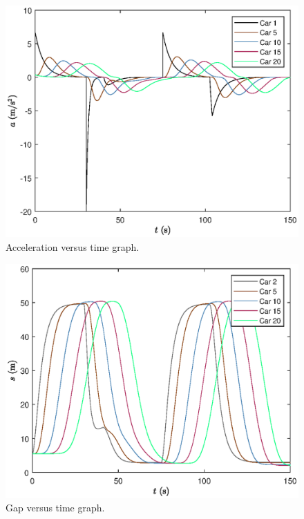 \documentclass[12pt]{article}
\begin{document}
  \begin{figure}[H]
  \includegraphics[width=13cm]{BottleNeck3.eps}
  \centering
  \caption{Acceleration versus time graph.}
  \label{fig:obstacleAcc}
  \end{figure}

  \begin{figure}[H]
  \includegraphics[width=13cm]{BottleNeck4.eps}
  \centering
  \caption{Gap versus time graph.}
  \label{fig:obstacleGap}
  \end{figure}
\end{document}
